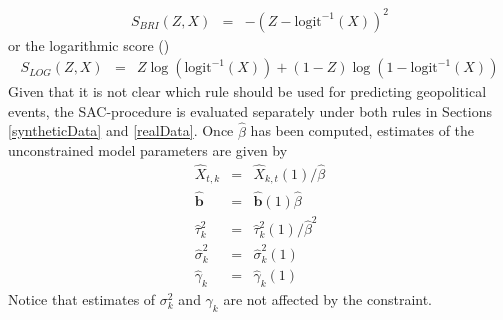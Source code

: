 \documentclass[aoas, preprint]{imsart}
\numberwithin{equation}{section}
\theoremstyle{plain}
\newcommand{\logit}{\text{logit}}
\begin{document}
\begin{eqnarray*}
S_{BRI}(Z, X) &=& -(Z - \logit^{-1}(X))^2
\end{eqnarray*}
or the logarithmic score (\citet{good1952rational})
\begin{eqnarray*}
S_{LOG}(Z, X) &=& Z \log\left(\logit^{-1}(X)\right) + (1-Z) \log\left(1-\logit^{-1}(X)\right)
\end{eqnarray*}
Given that it is not clear which rule should be used for predicting geopolitical events, the SAC-procedure is evaluated  separately under both rules in Sections \ref{syntheticData} and \ref{realData}. Once $\hat{\beta}$ has been computed, estimates of the unconstrained model parameters are given by
\begin{eqnarray}
 \hat{X}_{t,k}&=& \hat{X}_{k,t}(1) / \hat{\beta} \nonumber\\
 \hat{\boldsymbol{b}}&=& \hat{\boldsymbol{b}}(1) \hat{\beta} \nonumber\\
   \hat{\tau}_{k}^2&=& \hat{\tau}_{k}^2(1)/ \hat{\beta}^2\nonumber\\
  \hat{\sigma}_{k}^2&=& \hat{\sigma}_{k}^2(1)\nonumber\\
  \hat{\gamma}_{k}&=& \hat{\gamma}_{k}(1)\nonumber
\end{eqnarray}
Notice that estimates of $\sigma^2_k$ and $\gamma_k$ are not affected by the constraint.
\end{document}
